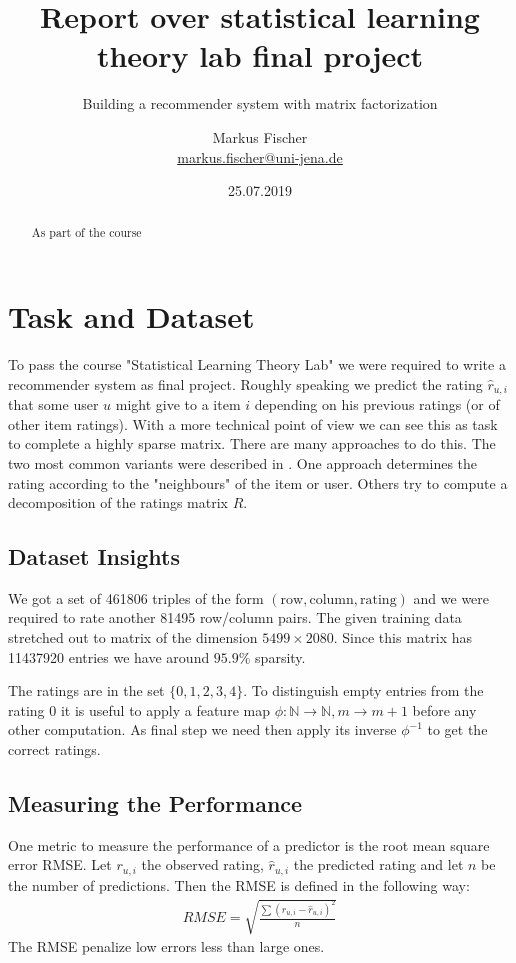 \documentclass[DIV=14,twocolumn]{scrartcl}
\title{Report over statistical learning theory lab final project}
\subtitle{Building a recommender system with matrix factorization}
\author{Markus Fischer\\ \small{\href{mailto:markus.fischer@uni-jena.de}{markus.fischer@uni-jena.de}}}
\date{25.07.2019}
\begin{document}
\maketitle
\begin{abstract}
As part of the course 
\end{abstract}

\section{Task and Dataset}
To pass the course "Statistical Learning Theory Lab" we were required to write a recommender system as final project. Roughly speaking we predict the rating $\hat{r}_{u,i}$ that some user $u$ might give to a item $i$ depending on his previous ratings (or of other item ratings). 
With a more technical point of view we can see this as task to complete a highly sparse matrix. There are many approaches to do this. The two most common variants were described in \cite{KoBeVo09}. One approach determines the rating according to the "neighbours" of the item or user. Others try to compute a decomposition of the ratings matrix $R$. 

\subsection{Dataset Insights}
We got a set of 461806 triples of the form $(\text{row},\text{column},\text{rating})$ and we were required to rate another 81495 row/column pairs. 
The given training data stretched out to matrix of the dimension $5499\times 2080$. Since this matrix has 11437920 entries we have around $95.9\%$ sparsity.

The ratings are in the set $\{0,1,2,3,4\}$. To distinguish empty entries from the rating 0 it is useful to apply a feature map $\phi:\mathbb{N}\rightarrow\mathbb{N},m\rightarrow m+1$ before any other computation. As final step we need then apply its inverse $\phi^{-1}$ to get the correct ratings.  

\subsection{Measuring the Performance}
One metric to measure the performance of a predictor is the root mean square error RMSE. Let $r_{u,i}$ the observed rating, $\hat{r}_{u,i}$ the predicted rating and let $n$ be the number of predictions. Then the RMSE is defined in the following way: 
\begin{equation*}
\begin{split}
RMSE = \sqrt{\frac{\sum (r_{u,i}-\hat{r}_{u,i})^2}{n}}
\end{split}
\end{equation*}
The RMSE penalize low errors less than large ones. 
\end{document}
